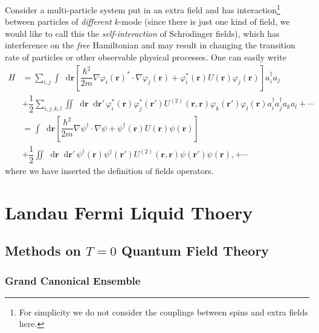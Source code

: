 \documentclass[b5paper,10pt,UTF8]{book}
\newcommand*\dd{\mathop{}\!\mathrm{d}}
\numberwithin{equation}{section}
\begin{document}
		\begin{Example}
			Consider a multi-particle system put in an extra field and has interaction\footnote{For simplicity we do not consider the couplings between spins and extra fields here.} between particles of \emph{different} $k$-mode (since there is just one kind of field, we would like to call this the \emph{self-interaction} of Schr$\ddot{\text{o}}$dinger fields), which has interference on the \emph{free} Hamiltonian and may result in changing the transition rate of particles or other observable physical processes. One can easily write
			\begin{align}
				H&=\sum_{i,j}\int\dd\bm{r}\left[\dfrac{\hbar^2}{2m}\nabla\varphi_i(\bm{r})^*\cdot\nabla\varphi_j(\bm{r})+\varphi_i^*(\bm{r})U(\bm{r})\varphi_j(\bm{r})\right]a^\dagger_i a_j\nonumber\\
				&+\dfrac{1}{2}\sum_{i,j,k,l}\iint\dd\bm{r}\dd\bm{r'}\,\varphi_i^*(\bm{r})\varphi^*_j(\bm{r'})U^{(2)}(\bm{r},\bm{r})\varphi_k(\bm{r'})\varphi_l(\bm{r})a_i^\dagger a_j^\dagger a_k a_l+\cdots\nonumber\\
				&=\int\dd\bm{r}\left[\dfrac{\hbar^2}{2m}\nabla\psi^\dagger\cdot\nabla\psi+\psi^\dagger(\bm{r})U(\bm{r})\psi(\bm{r})\right]\nonumber\\
				&+\dfrac{1}{2}\iint\dd\bm{r}\dd\bm{r'}\,\psi^\dagger(\bm{r})\psi^\dagger(\bm{r'})U^{(2)}(\bm{r},\bm{r})\psi(\bm{r'})\psi(\bm{r}),+\cdots\label{1.5.10}
			\end{align}
			where we have inserted the definition of fields operators.
		\end{Example}

\part{Landau Fermi Liquid Thoery}
\chapter{Methods on $T=0$ Quantum Field Theory}
	\section{Grand Canonical Ensemble}
\end{document}
